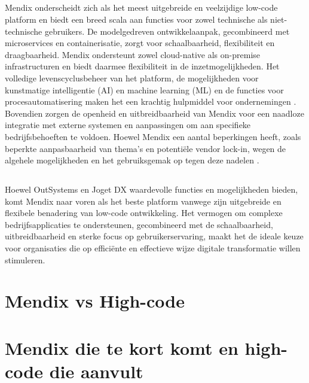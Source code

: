 \subsection{}
Mendix onderscheidt zich als het meest uitgebreide en veelzijdige low-code platform en biedt een breed scala aan functies voor zowel technische als niet-technische gebruikers. De modelgedreven ontwikkelaanpak, gecombineerd met microservices en containerisatie, zorgt voor schaalbaarheid, flexibiliteit en draagbaarheid. Mendix ondersteunt zowel cloud-native als on-premise infrastructuren en biedt daarmee flexibiliteit in de inzetmogelijkheden. Het volledige levenscyclusbeheer van het platform, de mogelijkheden voor kunstmatige intelligentie (AI) en machine learning (ML) en de functies voor procesautomatisering maken het een krachtig hulpmiddel voor ondernemingen \autocite{Sido2024}. Bovendien zorgen de openheid en uitbreidbaarheid van Mendix voor een naadloze integratie met externe systemen en aanpassingen om aan specifieke bedrijfsbehoeften te voldoen. Hoewel Mendix een aantal beperkingen heeft, zoals beperkte aanpasbaarheid van thema's en potentiële vendor lock-in, wegen de algehele mogelijkheden en het gebruiksgemak op tegen deze nadelen \autocite{Sido2024}.
\subsection{}
Hoewel OutSystems en Joget DX waardevolle functies en mogelijkheden bieden, komt Mendix naar voren als het beste platform vanwege zijn uitgebreide en flexibele benadering van low-code ontwikkeling. Het vermogen om complexe bedrijfsapplicaties te ondersteunen, gecombineerd met de schaalbaarheid, uitbreidbaarheid en sterke focus op gebruikerservaring, maakt het de ideale keuze voor organisaties die op efficiënte en effectieve wijze digitale transformatie willen stimuleren.

\section{Mendix vs High-code}
\section{Mendix die te kort komt en high-code die aanvult}
